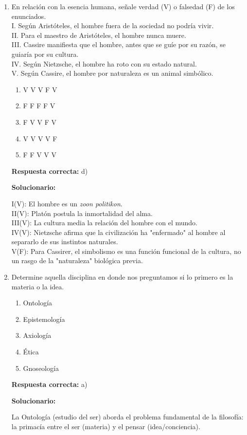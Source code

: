 \begin{enumerate}[resume]
	\item En relación con la esencia humana, señale verdad (V) o falsedad (F) de los enunciados.\\
	I. Según Aristóteles, el hombre fuera de la sociedad no podría vivir.\\
	II. Para el maestro de Aristóteles, el hombre nunca muere.\\
	III. Cassire manifiesta que el hombre, antes que se guíe por su razón, se guiaría por su cultura.\\
	IV. Según Nietzsche, el hombre ha roto con su estado natural.\\
	V. Según Cassire, el hombre por naturaleza es un animal simbólico.
	\begin{enumerate}[label=\alph*)]
		\item V V V F V
		\item F F F F V
		\item F V V F V
		\item V V V V F
		\item F F V V V
	\end{enumerate}
	\textbf{Respuesta correcta:} d)

	\vspace{2mm}
	\textbf{Solucionario:}

	I(V): El hombre es un \textit{zoon politikon}. \\
	II(V): Platón postula la inmortalidad del alma. \\
	III(V): La cultura media la relación del hombre con el mundo. \\
	IV(V): Nietzsche afirma que la civilización ha "enfermado" al hombre al separarlo de sus instintos naturales.\\
	V(F): Para Cassirer, el simbolismo es una función funcional de la cultura, no un rasgo de la "naturaleza" biológica previa.\\

	\vspace{6mm}

	\item Determine aquella disciplina en donde nos preguntamos si lo primero es la materia o la idea.
	\begin{enumerate}[label=\alph*)]
		\item Ontología
		\item Epistemología
		\item Axiología
		\item Ética
		\item Gnoseología
	\end{enumerate}
	\textbf{Respuesta correcta:} a)

	\vspace{2mm}
	\textbf{Solucionario:}

	La Ontología (estudio del ser) aborda el problema fundamental de la filosofía: la primacía entre el ser (materia) y el pensar (idea/conciencia).

	\vspace{6mm}
\end{enumerate}




